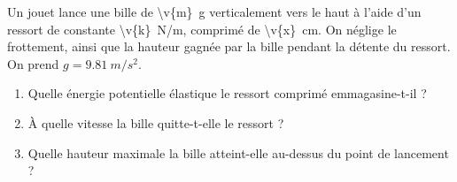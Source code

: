 Un jouet lance une bille de \qty{\v{m}}{g} verticalement vers le haut à l'aide d'un ressort de constante \qty{\v{k}}{N/m}, comprimé de \qty{\v{x}}{cm}. On néglige le frottement, ainsi que la hauteur gagnée par la bille pendant la détente du ressort. On prend $g = \qty{9.81}{m/s^2}$.

\begin{enumerate}[label=\alph*)]
    \item Quelle énergie potentielle élastique le ressort comprimé emmagasine-t-il ?
    \item À quelle vitesse la bille quitte-t-elle le ressort ?
    \item Quelle hauteur maximale la bille atteint-elle au-dessus du point de lancement ?
\end{enumerate}
